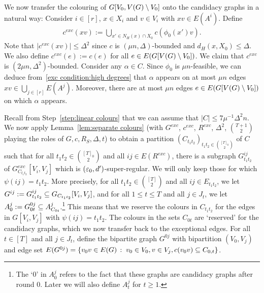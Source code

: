 \documentclass[10pt]{amsart}
\theoremstyle{definition}
\theoremstyle{claimstyle}
\theoremstyle{stepstyle}
\numberwithin{equation}{section}
\begin{document}
We now transfer the colouring of $G[V_0,V(G)\setminus V_0]$ onto the candidacy graphs in a natural way: Consider $i\in [r]$, $x\in X_i$ and $v\in V_i$ with $xv\in E(A^i)$. Define
\begin{align}
	c^{exc}(xv):=\bigcup_{x'\in N_H(x)\cap X_0}c(\phi_0(x')v).\label{exceptional colouring lifted}
\end{align}
Note that $|c^{exc}(xv)|\le \Delta^2$ since $c$ is $(\mu n, \Delta)$-bounded and $d_H(x,X_0)\le \Delta$.
We also define $c^{exc}(e):=c(e)$ for all $e\in E(G[V(G)\setminus V_0])$. We claim that $c^{exc}$ is $(2\mu n,\Delta^2)$-bounded. Consider any $\alpha \in C$. Since $\phi_0$ is $\mu n$-feasible, we can deduce from~\ref{exc condition:high degrees} that $\alpha$ appears on at most $\mu n$ edges $xv\in \bigcup_{j\in[r]}E(A^j)$. Moreover, there are at most $\mu n$ edges $e\in E(G[V(G)\setminus V_0])$ on which $\alpha$ appears.

Recall from Step~\ref*{step:linear colours} that we can assume that $|C|\leq 7\mu^{-1}\Delta^2 n$. We now apply Lemma~\ref{lem:separate colours} (with $G^{exc}$, $c^{exc}$, $R^{exc}$, $\Delta^2$, $\binom{T+1}{2}$ playing the roles of $G,c,R_S,\Delta,t$) to obtain a partition $(C_{t_1t_2})_{t_1t_2\in \binom{[T]_0}{2}}$ of $C$ such that for all $t_1t_2\in \binom{[T]_0}{2}$ and all $ij\in E(R^{exc})$,
there is a subgraph $G^{ij}_{t_1t_2}$ of $G^{exc}_{C_{t_1t_2}}[V_i,V_j]$ which is $({\varepsilon}_0,d')$-super-regular. We will only keep those for which $\psi(ij)=t_1t_2$. 
More precisely, for all $t_1t_2\in \binom{[T]}{2}$ and all $ij\in E_{t_1t_2}$, we let $G^{ij} := G^{ij}_{t_1t_2}\subseteq G_{C_{t_1t_2}}[V_i,V_j]$, and for all $1\le t\le T$ and all $j\in J_t$, we let $A_0^j:=G^{0j}_{0t} \subseteq A^j_{C_{0t}}$.\footnote{The `0' in $A^j_0$ refers to the fact that these graphs are candidacy graphs after round 0. Later we will also define $A_t^j$ for $t\geq 1$.}
This means that we reserve the colours in $C_{t_1t_2}$ for the edges in $G[V_i,V_j]$ with $\psi(ij)=t_1t_2$. The colours in the sets $C_{0t}$ are `reserved' for the candidacy graphs, which we now transfer back to the exceptional edges. For all $t\in [T]$ and all $j\in J_t$, define the bipartite graph $G^{0j}$ with bipartition $(V_0,V_j)$ and edge set $E(G^{0j})=\{v_0v\in E(G)\,:\;v_0\in V_0,v\in V_j,c(v_0v)\subseteq C_{0,t}\}$.
\end{document}
